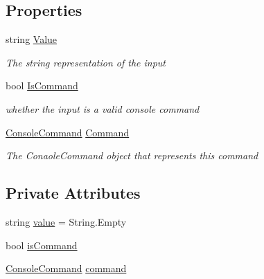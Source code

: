 \subsection*{Properties}
\begin{DoxyCompactItemize}
\item 
string \hyperlink{class_c_p_u___o_s___simulator_1_1_console_1_1_console_input_a2ad81ef96300694cbfe63aa02d098bf2}{Value}
\begin{DoxyCompactList}\small\item\em The string representation of the input \end{DoxyCompactList}\item 
bool \hyperlink{class_c_p_u___o_s___simulator_1_1_console_1_1_console_input_a41ebc5e7f419f80fe60ee45e54492d7e}{Is\+Command}
\begin{DoxyCompactList}\small\item\em whether the input is a valid console command \end{DoxyCompactList}\item 
\hyperlink{class_c_p_u___o_s___simulator_1_1_console_1_1_console_command}{Console\+Command} \hyperlink{class_c_p_u___o_s___simulator_1_1_console_1_1_console_input_a86a4918cd4a894e9af4fd6a5eced98ea}{Command}
\begin{DoxyCompactList}\small\item\em The Conaole\+Command object that represents this command \end{DoxyCompactList}\end{DoxyCompactItemize}
\subsection*{Private Attributes}
\begin{DoxyCompactItemize}
\item 
string \hyperlink{class_c_p_u___o_s___simulator_1_1_console_1_1_console_input_a859295836e526e9b8b5e3da265caa177}{value} = String.\+Empty
\item 
bool \hyperlink{class_c_p_u___o_s___simulator_1_1_console_1_1_console_input_a56609a7b8e3d6bda9e166198e3a176c0}{is\+Command}
\item 
\hyperlink{class_c_p_u___o_s___simulator_1_1_console_1_1_console_command}{Console\+Command} \hyperlink{class_c_p_u___o_s___simulator_1_1_console_1_1_console_input_afb0447ccf1317612da0230afe6445d3e}{command}
\end{DoxyCompactItemize}


